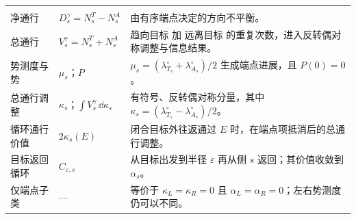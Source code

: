 \begin{longtable}{@{}>{\raggedright\arraybackslash}p{}>{\raggedright\arraybackslash}p{}>{\raggedright\arraybackslash}p{}@{}}
\multicolumn{3}{@{}l}{\textit{分解与识别}}\\*
净通行 & $D_s^\gamma=N_s^T-N_s^A$ & 由有序端点决定的方向不平衡。\\
总通行 & $V_s^\gamma=N_s^T+N_s^A$ & 趋向目标 加 远离目标 的重复次数，进入反转偶对称调整与信息结果。\\
势测度与势 & $\mu_s$；$P$ & $\mu_s=(\lambda_{T_s}^{\circ}+\lambda_{A_s}^{\circ})/2$ 生成端点进展，且 $P(0)=0$。\\
总通行调整 & $\kappa_s$；$\int V_s^\gamma\,\dd\kappa_s$ & 有符号、反转偶对称分量，其中 $\kappa_s=(\lambda_{T_s}^{\circ}-\lambda_{A_s}^{\circ})/2$。\\
循环通行价值 & $2\kappa_s(E)$ & 闭合目标外往返通过 $E$ 时，在端点项抵消后的总通行调整。\\
目标返回循环 & $C_{\varepsilon,s}$ & 从目标出发到半径 $\varepsilon$ 再从侧 $s$ 返回；其价值收敛到 $\alpha_s$。\\
仅端点子类 & --- & 等价于 $\kappa_L=\kappa_R=0$ 且 $\alpha_L=\alpha_R=0$；左右势测度仍可以不同。\\

\end{longtable}
\endgroup
